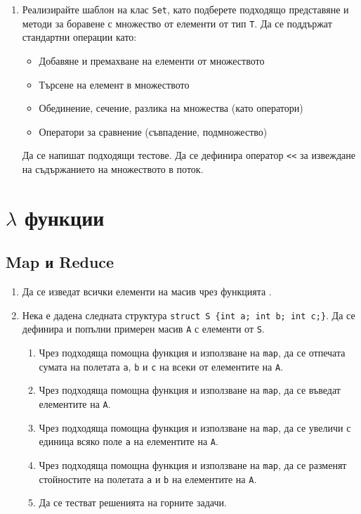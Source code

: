 \begin{enumerate}[resume]
\item Реализирайте шаблон на клас \texttt{Set}, като подберете подходящо представяне и методи за боравене с множество от елементи от тип \texttt{T}. Да се поддържат стандартни операции като:
\begin{itemize}
  \item Добавяне и премахване на елементи от множеството
  \item Търсене на елемент в множеството
  \item Обединение, сечение, разлика на множества (като оператори)
  \item Оператори за сравнение (съвпадение, подмножество)
\end{itemize}

Да се напишат подходящи тестове. Да се дефинира оператор \texttt{<<} за извеждане на съдържанието на множеството в поток.






\end{enumerate}


\pagebreak

\clearpage

\section{$\lambda$ функции}

\subsection {Map и Reduce}

\begin{enumerate}[]  
  \item Да се изведат всички елементи на масив чрез функцията .
  
  \item Нека е дадена следната структура \texttt{struct S \{int a; int b; int c;\}}. Да се дефинира и попълни примерен масив \texttt{A} с елементи от  \texttt{S}. 
  
  \begin{enumerate}[label=\alph*)]
    \item Чрез подходяща помощна функция и използване на \texttt{map}, да се отпечата сумата на полетата \texttt{a}, \texttt{b} и \texttt{c} на всеки от елементите на \texttt{A}.
    \item Чрез подходяща помощна функция и използване на \texttt{map}, да се въведат елементите на \texttt{A}.
    \item Чрез подходяща помощна функция и използване на \texttt{map}, да се увеличи с единица всяко поле \texttt{a} на елементите на \texttt{A}.
    \item Чрез подходяща помощна функция и използване на \texttt{map}, да се разменят стойностите на полетата \texttt{a} и \texttt{b} на елементите на \texttt{A}.
    \item Да се тестват решенията на горните задачи.
    
  \end{enumerate}
  
\end{enumerate}

